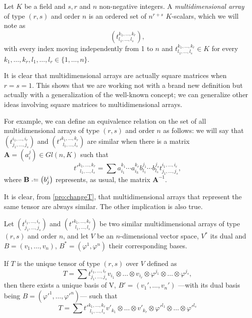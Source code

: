 \begin{definition}
	Let $K$ be a field and $s, r$ and $n$ non-negative integers. A \emph{multidimensional array} of type $(r,s)$ and order $n$ is an ordered set of $n^{r+s}$ $K$-scalars, which we will note as
	\[
	\left( t^{k_1, \dots, k_r}_{l_1, \dots, l_s} \right),
	\]
	with every index moving independently from 1 to $n$ and $t^{k_1, \dots, k_r}_{l_1, \dots, l_s} \in K$ for every $k_1, \dots, k_r, l_1, \dots, l_r \in \{1, \dots, n\}$.
\end{definition}

It is clear that multidimensional arrays are actually square matrices when $r = s = 1$. This shows that we are working not with a brand new definition but actually with a generalization of the well-known concept; we can generalize other ideas involving square matrices to multidimensional arrays.

For example, we can define an equivalence relation on the set of all multidimensional arrays of type $(r,s)$ and order $n$ as follows: we will say that $\left( t_{j_1,\dots,j_s}^{i_1,\dots,i_r} \right)$ and $\left( t'^{k_1,\dots,k_r}_{\phantom{'}l_1,\dots,l_s} \right)$ are similar when there is a matrix $\mathbf{A} = \left(a^j_i\right) \in Gl(n,K)$ such that
\[
	t'^{k_1,\dots,k_r}_{\phantom{'}l_1,\dots,l_s} = \sum a_{i_1}^{k_1} \cdots a_{i_k}^{k_r} b_{l_1}^{j_1} \cdots b_{l_s}^{j_s} t_{j_1,\dots,j_s}^{i_1,\dots,i_r},
\]
where $\mathbf{B} \defeq \left( b^i_j\right)$ represents, as usual, the matrix $\mathbf{A}^{-1}$.

It is clear, from \autoref{pro:changeT}, that multidimensional arrays that represent the same tensor are always similar. The other implication is also true.

\begin{proposition}
	\label{pro:multisimilar}
	Let $\left( t_{j_1,\dots,j_s}^{i_1,\dots,i_r} \right)$ and $\left( t'^{k_1,\dots,k_r}_{\phantom{'}l_1,\dots,l_s} \right)$ be two similar multidimensional arrays of type $(r,s)$ and order $n$, and let $V$ be an $n$-dimensional vector space, $V^*$ its dual and $B = (v_1, \dots, v_n)$, $B^* = (\varphi^1, \varphi^n)$ their corresponding bases.
	
	If $T$ is the unique tensor of type $(r,s)$ over $V$ defined as
	\[
	T = \sum t_{j_1,\dots,j_s}^{i_1,\dots,i_r} v_{i_1} \otimes \dots \otimes v_{i_r} \otimes \varphi^{j_1} \otimes \dots \otimes \varphi^{j_s},
	\]
	then there exists a unique basis of V, $B' = (v_1', \dots, v_n')$ ---with its dual basis being $B = (\varphi'^1, \dots, \varphi'^n)$--- such that
	\[
	T = \sum t'^{k_1,\dots,k_r}_{\phantom{'}l_1,\dots,l_s} v'_{k_1} \otimes \dots \otimes v'_{k_r} \otimes \varphi'^{l_1} \otimes \dots \otimes \varphi'^{l_s}
	\]
\end{proposition}

